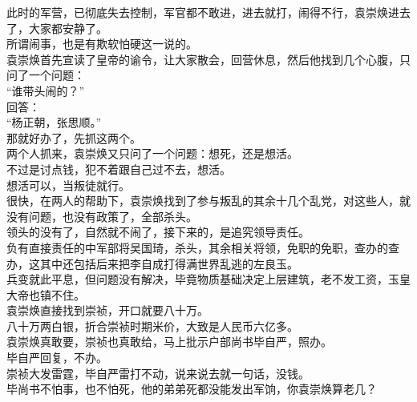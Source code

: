 \begin{multicols}{\theparacolNo}
此时的军营，已彻底失去控制，军官都不敢进，进去就打，闹得不行，袁崇焕进去了，大家都安静了。\\

所谓闹事，也是有欺软怕硬这一说的。\\

袁崇焕首先宣读了皇帝的谕令，让大家散会，回营休息，然后他找到几个心腹，只问了一个问题：\\

“谁带头闹的？”\\

回答：\\

“杨正朝，张思顺。”\\

那就好办了，先抓这两个。\\

两个人抓来，袁崇焕又只问了一个问题：想死，还是想活。\\

不过是讨点钱，犯不着跟自己过不去，想活。\\

想活可以，当叛徒就行。\\

很快，在两人的帮助下，袁崇焕找到了参与叛乱的其余十几个乱党，对这些人，就没有问题，也没有政策了，全部杀头。\\

领头的没有了，自然就不闹了，接下来的，是追究领导责任。\\

负有直接责任的中军部将吴国琦，杀头，其余相关将领，免职的免职，查办的查办，这其中还包括后来把李自成打得满世界乱逃的左良玉。\\

兵变就此平息，但问题没有解决，毕竟物质基础决定上层建筑，老不发工资，玉皇大帝也镇不住。\\

袁崇焕直接找到崇祯，开口就要八十万。\\

八十万两白银，折合崇祯时期米价，大致是人民币六亿多。\\

袁崇焕真敢要，崇祯也真敢给，马上批示户部尚书毕自严，照办。\\

毕自严回复，不办。\\

崇祯大发雷霆，毕自严雷打不动，说来说去就一句话，没钱。\\

毕尚书不怕事，也不怕死，他的弟弟死都没能发出军饷，你袁崇焕算老几？\\


\end{multicols}
